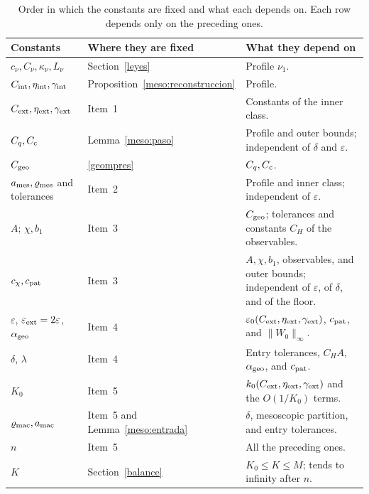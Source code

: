 \begin{table}[htbp]
\centering\small
\caption{Order in which the constants are fixed and what each depends on. Each row depends only on
the preceding ones.}
\label{tab:constantes}
\begin{tabular}{@{}p{.25\linewidth}p{.22\linewidth}>{\raggedright\arraybackslash}p{.45\linewidth}@{}}
\toprule
Constants & Where they are fixed & What they depend on \\
\midrule
$c_\nu,C_\nu,\kappa_\nu,L_\nu$ & Section~\ref{leyes} & Profile $\nu_1$. \\
$C_{\rm int},\eta_{\rm int},\gamma_{\rm int}$ & Proposition~\ref{meso:reconstruccion} & Profile. \\
$C_{\rm ext},\eta_{\rm ext},\gamma_{\rm ext}$ & Item~1 & Constants of the inner class. \\
$C_q,C_{\rm c}$ & Lemma~\ref{meso:paso} & Profile and outer bounds; independent of $\delta$ and
$\varepsilon$. \\
$C_{\rm geo}$ & \eqref{geompres} & $C_q,C_{\rm c}$. \\
\addlinespace[.22em]
$a_{\rm mes},\varrho_{\rm mes}$ and tolerances & Item~2 & Profile and inner class; independent of
$\varepsilon$. \\
$A$; $\chi,b_1$ & Item~3 & $C_{\rm geo}$; tolerances and constants $C_H$ of the observables. \\
$c_\chi,c_{\rm pat}$ & Item~3 & $A,\chi,b_1$, observables, and outer bounds; independent of
$\varepsilon$, of $\delta$, and of the floor. \\
\addlinespace[.22em]
$\varepsilon$, $\varepsilon_{\rm ext}=2\varepsilon$, $\alpha_{\rm geo}$ & Item~4 &
$\varepsilon_0(C_{\rm ext},\eta_{\rm ext},\gamma_{\rm ext})$, $c_{\rm pat}$, and $\|W_0\|_\infty$. \\
$\delta$, $\lambda$ & Item~4 & Entry tolerances, $C_HA$, $\alpha_{\rm geo}$, and $c_{\rm pat}$. \\
$K_0$ & Item~5 & $k_0(C_{\rm ext},\eta_{\rm ext},\gamma_{\rm ext})$ and the $O(1/K_0)$ terms. \\
$\varrho_{\rm mac},a_{\rm mac}$ & Item~5 and Lemma~\ref{meso:entrada} & $\delta$, mesoscopic
partition, and entry tolerances. \\
$n$ & Item~5 & All the preceding ones. \\
$K$ & Section~\ref{balance} & $K_0\le K\le M$; tends to infinity after $n$. \\
\bottomrule
\end{tabular}
\end{table}
